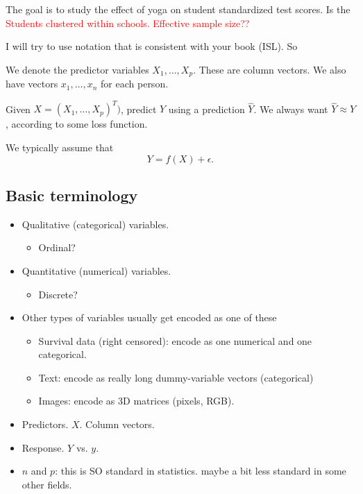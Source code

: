 \documentclass[titlepage,10pt]{scrartcl}
\begin{document}
The goal is to study the effect of yoga on student standardized test scores. Is the 
\textcolor{red}{Students clustered within schools. Effective sample size?? }



I will try to use notation that is consistent with your book (ISL). So 

We denote the predictor variables $X_1,\ldots,X_p$. These are column vectors. We also have vectors $x_1,\ldots,x_n$ for each person. 







Given $X = (X_1, \ldots, X_p)^T)$, predict $Y$ using a prediction $\hat{Y}$. We always want $\hat{Y} \approx Y$, according to some loss function. 

We typically assume that
$$
Y = f(X)+\epsilon. 
$$









\subsection{Basic terminology}
\begin{itemize}
\item Qualitative (categorical) variables.
\begin{itemize}
\item Ordinal? 
\end{itemize}
\item Quantitative (numerical) variables. 
\begin{itemize}
\item Discrete? 
\end{itemize}
\item Other types of variables usually get encoded as one of these
\begin{itemize}
\item Survival data (right censored): encode as one numerical and one categorical.
\item Text: encode as really long dummy-variable vectors (categorical)
\item Images: encode as 3D matrices (pixels, RGB). 
\end{itemize}
\item Predictors. $X$. Column vectors. 
\item Response. $Y$ vs. $y$.
\item $n$ and $p$: this is SO standard in statistics. maybe a bit less standard in some other fields. 
\end{itemize}
\end{document}
